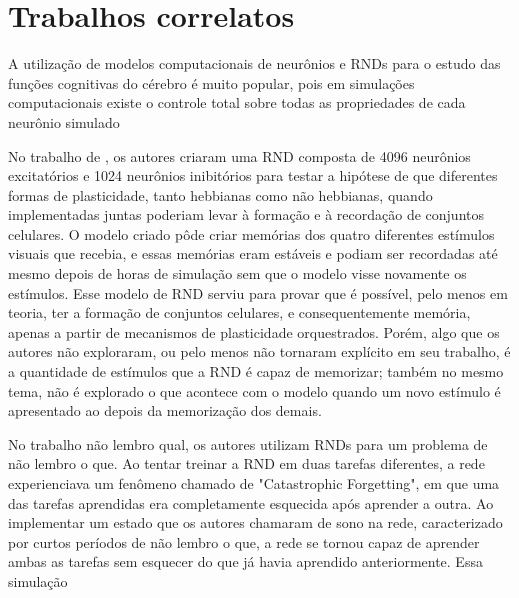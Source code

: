 \chapter{Trabalhos correlatos}






A utilização de modelos computacionais de neurônios e RNDs para o estudo das funções cognitivas do cérebro é muito popular, pois em simulações
computacionais existe o controle total sobre todas as propriedades de cada neurônio simulado


No trabalho de \cite{Zenke}, os autores criaram uma RND composta de 4096 neurônios excitatórios e 1024 neurônios inibitórios para testar
a hipótese de que diferentes formas de plasticidade, tanto hebbianas como não hebbianas, quando implementadas juntas poderiam levar à formação
e à recordação de conjuntos celulares. O modelo criado pôde criar memórias dos quatro diferentes estímulos visuais que recebia,
e essas memórias eram estáveis e podiam ser recordadas até mesmo depois de horas de simulação sem que o modelo visse novamente os
estímulos. Esse modelo de RND serviu para provar que é possível, pelo menos em teoria, ter a formação de conjuntos celulares, e consequentemente
memória, apenas a partir de mecanismos de plasticidade orquestrados. Porém, algo que os autores não exploraram, ou pelo menos não tornaram explícito
em seu trabalho, é a quantidade de estímulos que a RND é capaz de memorizar; também no mesmo tema, não é explorado o que acontece com o modelo
quando um novo estímulo é apresentado ao depois da memorização dos demais.

No trabalho não lembro qual, os autores utilizam RNDs para um problema de não lembro o que. Ao tentar
treinar a RND em duas tarefas diferentes, a rede experienciava um fenômeno chamado de "Catastrophic
Forgetting", em que uma das tarefas aprendidas era completamente esquecida após aprender a outra. Ao
implementar um estado que os autores chamaram de sono na rede, caracterizado por curtos períodos
de não lembro o que, a rede se tornou capaz de aprender ambas as tarefas sem esquecer do que já havia
aprendido anteriormente. Essa simulação



